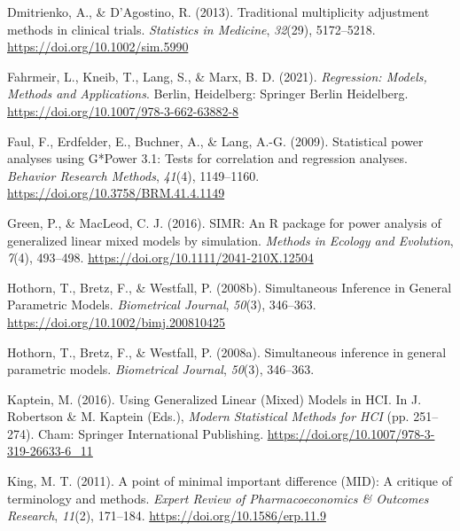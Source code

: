 \documentclass[
  man,floatsintext]{apa6}
\newlength{\cslhangindent}
\newlength{\cslentryspacingunit} %
\newenvironment{CSLReferences}[2] %
 {%
  \setlength{\parindent}{0pt}
  \ifodd #1
  \let\oldpar\par
  \def\par{\hangindent=\cslhangindent\oldpar}
  \fi
  \setlength{\parskip}{#2\cslentryspacingunit}
 }%
 {}
\begin{document}
\begin{CSLReferences}{1}{0}
\leavevmode{}%
Dmitrienko, A., \& D'Agostino, R. (2013). Traditional multiplicity adjustment methods in clinical trials. \emph{Statistics in Medicine}, \emph{32}(29), 5172--5218. \url{https://doi.org/10.1002/sim.5990}

\leavevmode{}%
Fahrmeir, L., Kneib, T., Lang, S., \& Marx, B. D. (2021). \emph{Regression: {Models}, {Methods} and {Applications}}. {Berlin, Heidelberg}: {Springer Berlin Heidelberg}. \url{https://doi.org/10.1007/978-3-662-63882-8}

\leavevmode{}%
Faul, F., Erdfelder, E., Buchner, A., \& Lang, A.-G. (2009). Statistical power analyses using {G}*{Power} 3.1: {Tests} for correlation and regression analyses. \emph{Behavior Research Methods}, \emph{41}(4), 1149--1160. \url{https://doi.org/10.3758/BRM.41.4.1149}

\leavevmode{}%
Green, P., \& MacLeod, C. J. (2016). {SIMR}: An {R} package for power analysis of generalized linear mixed models by simulation. \emph{Methods in Ecology and Evolution}, \emph{7}(4), 493--498. \url{https://doi.org/10.1111/2041-210X.12504}

\leavevmode{}%
Hothorn, T., Bretz, F., \& Westfall, P. (2008b). Simultaneous {Inference} in {General Parametric Models}. \emph{Biometrical Journal}, \emph{50}(3), 346--363. \url{https://doi.org/10.1002/bimj.200810425}

\leavevmode{}%
Hothorn, T., Bretz, F., \& Westfall, P. (2008a). Simultaneous inference in general parametric models. \emph{Biometrical Journal}, \emph{50}(3), 346--363.

\leavevmode{}%
Kaptein, M. (2016). Using {Generalized Linear} ({Mixed}) {Models} in {HCI}. In J. Robertson \& M. Kaptein (Eds.), \emph{Modern {Statistical Methods} for {HCI}} (pp. 251--274). {Cham}: {Springer International Publishing}. \url{https://doi.org/10.1007/978-3-319-26633-6_11}

\leavevmode{}%
King, M. T. (2011). A point of minimal important difference ({MID}): A critique of terminology and methods. \emph{Expert Review of Pharmacoeconomics \& Outcomes Research}, \emph{11}(2), 171--184. \url{https://doi.org/10.1586/erp.11.9}


\end{CSLReferences}
\end{document}
